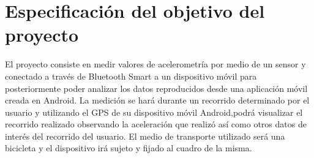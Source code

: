 \section{Especificación del objetivo del proyecto}
\label{makereference1.3}

El proyecto consiste en medir valores de acelerometría por medio de un sensor y conectado a través de Bluetooth Smart a un dispositivo móvil para posteriormente poder analizar los datos reproducidos desde una aplicación móvil creada en Android.
La medición se hará durante un recorrido determinado por el usuario y utilizando el GPS de su dispositivo móvil Android,podrá visualizar el recorrido realizado observando la aceleración que realizó así como otros datos de interés del recorrido del usuario.
El medio de transporte utilizado será una bicicleta y el dispositivo irá sujeto y fijado al cuadro de la misma.

%
%
%





